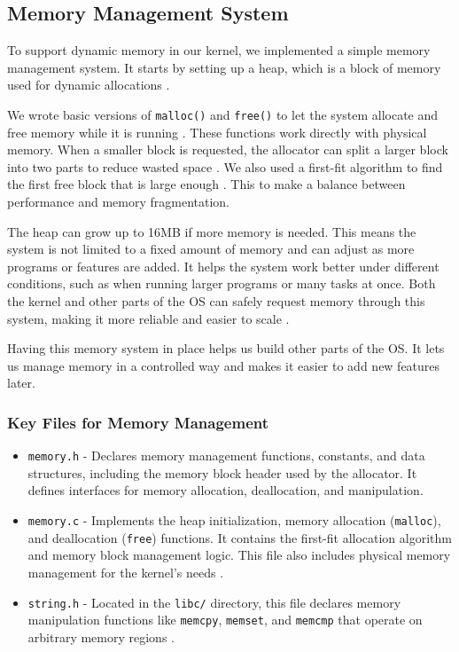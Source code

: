 \documentclass[a4paper,11pt]{article}
\begin{document}
\subsection{Memory Management System}

To support dynamic memory in our kernel, we implemented a simple memory management system. It starts by setting up a heap, which is a block of memory used for dynamic allocations \cite{OSDev_Heap}.

We wrote basic versions of \texttt{malloc()} and \texttt{free()} to let the system allocate and free memory while it is running \cite{GNU_malloc}. These functions work directly with physical memory. When a smaller block is requested, the allocator can split a larger block into two parts to reduce wasted space \cite{MemoryAllocation}. We also used a first-fit algorithm to find the first free block that is large enough \cite{FirstFit}. This to make a balance between performance and memory fragmentation.

The heap can grow up to 16MB if more memory is needed. This means the system is not limited to a fixed amount of memory and can adjust as more programs or features are added. It helps the system work better under different conditions, such as when running larger programs or many tasks at once. Both the kernel and other parts of the OS can safely request memory through this system, making it more reliable and easier to scale \cite{OSDev_Heap}.

Having this memory system in place helps us build other parts of the OS. It lets us manage memory in a controlled way and makes it easier to add new features later.


\subsubsection{Key Files for Memory Management}
\begin{itemize}
    \item \texttt{memory.h} - Declares memory management functions, constants, and data structures, including the memory block header used by the allocator. It defines interfaces for memory allocation, deallocation, and manipulation.
    
    \item \texttt{memory.c} - Implements the heap initialization, memory allocation (\texttt{malloc}), and deallocation (\texttt{free}) functions. It contains the first-fit allocation algorithm and memory block management logic. This file also includes physical memory management for the kernel's needs \cite{GNU_malloc} \cite{FirstFit} \cite{MemoryAllocation}.
    
    \item \texttt{string.h} - Located in the \texttt{libc/} directory, this file declares memory manipulation functions like \texttt{memcpy}, \texttt{memset}, and \texttt{memcmp} that operate on arbitrary memory regions \cite{OSDev_String}.
\end{itemize}
\end{document}
